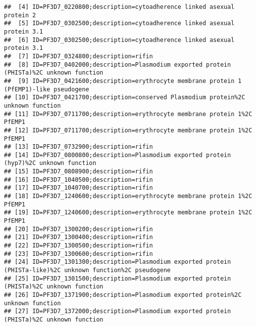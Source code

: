 \documentclass{article}\usepackage[]{graphicx}\usepackage[]{color}
\makeatletter
\newenvironment{kframe}{%
 \def\at@end@of@kframe{}%
 \ifinner\ifhmode%
  \def\at@end@of@kframe{\end{minipage}}%
  \begin{minipage}{\columnwidth}%
 \fi\fi%
 \def\FrameCommand##1{\hskip\@totalleftmargin \hskip-\fboxsep
 \colorbox{shadecolor}{##1}\hskip-\fboxsep
     \hskip-\linewidth \hskip-\@totalleftmargin \hskip\columnwidth}%
 \MakeFramed {\advance\hsize-\width
   \@totalleftmargin\z@ \linewidth\hsize
   \@setminipage}}%
 {\par\unskip\endMakeFramed%
 \at@end@of@kframe}
\newenvironment{knitrout}{}{} %
\makeatother
\begin{document}
\begin{knitrout}
\begin{kframe}
\begin{verbatim}
##  [4] ID=PF3D7_0220800;description=cytoadherence linked asexual protein 2                                     
##  [5] ID=PF3D7_0302500;description=cytoadherence linked asexual protein 3.1                                   
##  [6] ID=PF3D7_0302500;description=cytoadherence linked asexual protein 3.1                                   
##  [7] ID=PF3D7_0324800;description=rifin                                                                      
##  [8] ID=PF3D7_0402000;description=Plasmodium exported protein (PHISTa)%2C unknown function                   
##  [9] ID=PF3D7_0421600;description=erythrocyte membrane protein 1 (PfEMP1)-like pseudogene                    
## [10] ID=PF3D7_0421700;description=conserved Plasmodium protein%2C unknown function                           
## [11] ID=PF3D7_0711700;description=erythrocyte membrane protein 1%2C PfEMP1                                   
## [12] ID=PF3D7_0711700;description=erythrocyte membrane protein 1%2C PfEMP1                                   
## [13] ID=PF3D7_0732900;description=rifin                                                                      
## [14] ID=PF3D7_0800800;description=Plasmodium exported protein (hyp7)%2C unknown function                     
## [15] ID=PF3D7_0808900;description=rifin                                                                      
## [16] ID=PF3D7_1040500;description=rifin                                                                      
## [17] ID=PF3D7_1040700;description=rifin                                                                      
## [18] ID=PF3D7_1240600;description=erythrocyte membrane protein 1%2C PfEMP1                                   
## [19] ID=PF3D7_1240600;description=erythrocyte membrane protein 1%2C PfEMP1                                   
## [20] ID=PF3D7_1300200;description=rifin                                                                      
## [21] ID=PF3D7_1300400;description=rifin                                                                      
## [22] ID=PF3D7_1300500;description=rifin                                                                      
## [23] ID=PF3D7_1300600;description=rifin                                                                      
## [24] ID=PF3D7_1301300;description=Plasmodium exported protein (PHISTa-like)%2C unknown function%2C pseudogene
## [25] ID=PF3D7_1301500;description=Plasmodium exported protein (PHISTa)%2C unknown function                   
## [26] ID=PF3D7_1371900;description=Plasmodium exported protein%2C unknown function                            
## [27] ID=PF3D7_1372000;description=Plasmodium exported protein (PHISTa)%2C unknown function                   

\end{verbatim}
\end{kframe}
\end{knitrout}
\end{document}
